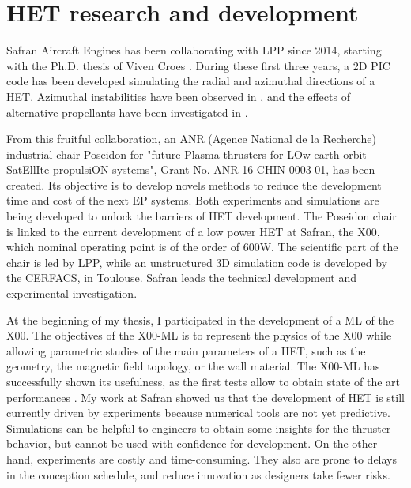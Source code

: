 

\section*{\ac{HET} research and development}
\label{sec-poseidon}

Safran Aircraft Engines has been collaborating with \ac{LPP} since 2014, starting with the Ph.D. thesis of Viven Croes \citep{croes2017}.
During these first three years, a \ac{2D} \ac{PIC} code has been developed simulating the radial and azimuthal directions of a \ac{HET}.
Azimuthal instabilities have been observed in \citet{croes2017a}, and the effects of alternative propellants have been investigated in \citet{croes2018}.

From this fruitful collaboration, an ANR (Agence National de la Recherche) industrial chair {\sc Poseidon} for  "future Plasma thrusters for LOw earth orbit SatEllIte propulsiON systems", Grant No. ANR-16-CHIN-0003-01, has been created.
Its objective is to develop novels methods to reduce the development time and cost of the next \ac{EP} systems.
Both experiments and simulations are being developed to unlock the barriers of \ac{HET} development.
The {\sc Poseidon} chair is linked to the current development of a  low power \ac{HET} at Safran, the \PPS X00, which nominal operating point is of the order of 600W.
The scientific part of the chair is led by \ac{LPP}, while an unstructured \ac{3D} simulation code is developed by the CERFACS, in Toulouse.
Safran leads the technical development and experimental investigation.

At the beginning of my thesis, I participated in the development of a \ac{ML} of the \PPS X00.
The objectives of the \PPS X00-\ac{ML}  is to represent the physics of the \PPS X00 while allowing parametric studies of the main parameters of a \ac{HET}, such as the geometry, the magnetic field topology, or the wall material.
The \PPS X00-\ac{ML} has successfully shown its usefulness, as the first tests allow to obtain state of the art performances \citep{vaudolon2018}.
My work at Safran showed us that the development of \ac{HET} is still currently driven by experiments because numerical tools are not yet predictive.
Simulations can be helpful to engineers to obtain some insights for the thruster behavior, but cannot be used with confidence for development.
On the other hand, experiments are costly and time-consuming.
They also are prone to delays in the conception schedule, and reduce innovation as designers take fewer risks.

